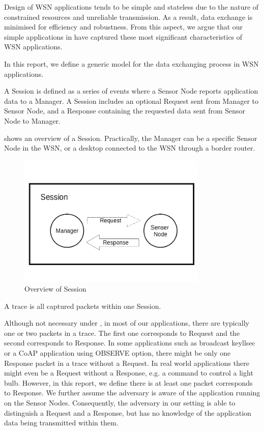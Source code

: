 Design of WSN applications tends to be simple and stateless due to the nature of constrained resources and unreliable transmission. As a result, data exchange is minimised for efficiency and robustness. From this aspect, we argue that our simple applications in  have captured these most significant characteristics of WSN applications.

In this report, we define a generic model for the data exchanging process in WSN applications.

\begin{definition} \label{Def: Session}
A Session is defined as a series of events where a Sensor Node reports application data to a Manager. A Session includes an optional Request sent from Manager to Sensor Node, and a Response containing the requested data sent from Sensor Node to Manager.
\end{definition}

 shows an overview of a Session. Practically, the Manager can be a specific Sensor Node in the WSN, or a desktop connected to the WSN through a border router.

\begin{figure}[h!]
	\center
	\includegraphics[width=0.8\textwidth]{fig/Session.png}
	\caption{Overview of Session}
	\label{Fig: Overview of Session}
\end{figure}

\begin{definition} \label{Def: Trace}
A trace is all captured packets within one Session.
\end{definition}

Although not necessary under , in most of our applications, there are typically one or two packets in a trace. The first one corresponds to Request and the second corresponds to Response. In some applications such as broadcast keyllsec or a CoAP application using OBSERVE option, there might be only one Response packet in a trace without a Request. In real world applications there might even be a Request without a Response, e.g. a command to control a light bulb. However, in this report, we define there is at least one packet corresponds to Response. We further assume the adversary is aware of the application running on the Sensor Nodes. Consequently, the adversary in our setting is able to distinguish a Request and a Response, but has no knowledge of the application data being transmitted within them.

